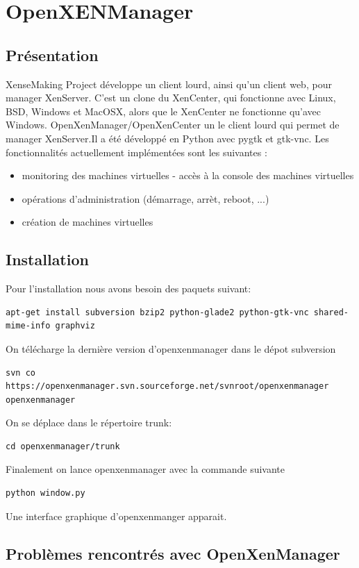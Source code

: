 \lstset{language=bash}
\chapter{OpenXENManager}
\section{Présentation}
XenseMaking Project développe un client lourd, ainsi qu'un client
web, pour manager XenServer. C'est un clone du XenCenter, qui fonctionne
avec Linux, BSD, Windows et MacOSX, alors que le XenCenter ne fonctionne
qu'avec Windows. OpenXenManager/OpenXenCenter un le client lourd qui
permet de manager XenServer.Il a été développé en Python avec pygtk
et gtk-vnc.
Les fonctionnalités actuellement implémentées sont les suivantes :
\begin{itemize}
\item monitoring des machines virtuelles - accès à la console des machines virtuelles
\item opérations d'administration (démarrage, arrèt, reboot, ...)
\item création de machines virtuelles
\end{itemize}
\section{Installation}
Pour l'installation nous avons besoin des paquets suivant:
\begin{lstlisting}
apt-get install subversion bzip2 python-glade2 python-gtk-vnc shared-mime-info graphviz
\end{lstlisting}
On télécharge la dernière version d'openxenmanager dans le dépot subversion
\begin{lstlisting}
svn co https://openxenmanager.svn.sourceforge.net/svnroot/openxenmanager openxenmanager
\end{lstlisting}
On se déplace dans le répertoire trunk:
\begin{lstlisting}
cd openxenmanager/trunk
\end{lstlisting}
Finalement on lance openxenmanager avec la commande suivante
\begin{lstlisting}
python window.py
\end{lstlisting}
Une interface graphique d'openxenmanger apparait.

\section{Problèmes rencontrés avec OpenXenManager}

